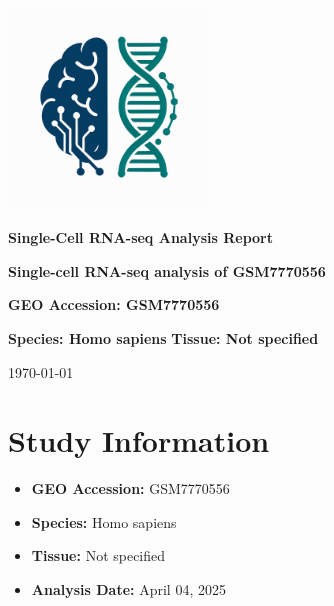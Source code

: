 \documentclass[12pt]{article}
\begin{document}
\begin{titlepage}
    \centering
    \vspace*{2cm}

    \includegraphics[width=0.4\textwidth]{scagentic_logo.png}
    \vspace{1cm}

    \Huge\textbf{Single-Cell RNA-seq Analysis Report}
    \vspace{1cm}

    \Large\textbf{Single-cell RNA-seq analysis of GSM7770556}
    \vspace{0.5cm}

    \Large\textbf{GEO Accession: GSM7770556}
    \vspace{0.5cm}

    \Large\textbf{Species: Homo sapiens}
    \vspace{0.5cm}
    \Large\textbf{Tissue: Not specified}
    \vspace{1cm}

    \large\today
\end{titlepage}

\tableofcontents
\newpage

\section{Study Information}
\begin{itemize}
    \item \textbf{GEO Accession:} GSM7770556
    \item \textbf{Species:} Homo sapiens
    \item \textbf{Tissue:} Not specified
    \item \textbf{Analysis Date:} {April 04, 2025}
\end{itemize}

\end{document}

